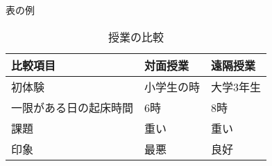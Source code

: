 \begin{frame}{表の例}
    \begin{table}[h]
        \caption{授業の比較}
        \centering
        \begin{tabular}{lll}
            \toprule
            比較項目 & 対面授業 & 遠隔授業 \\ \midrule
            初体験 & 小学生の時 & 大学3年生 \\
            一限がある日の起床時間 & 6時 & 8時 \\
            課題 & 重い & 重い \\
            印象 & 最悪 & 良好 \\ \bottomrule
        \end{tabular}
    \end{table}
\end{frame}
